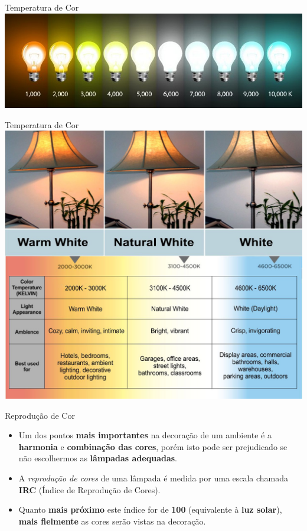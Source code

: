 \begin{frame}{Temperatura de Cor}
	\centering
	\includegraphics[width=1\linewidth]{Figuras/Ch07/fig2}
\end{frame}


\begin{frame}{Temperatura de Cor}
	\centering
	\includegraphics[width=0.7\linewidth]{Figuras/Ch07/fig3}
\end{frame}


\begin{frame}{Reprodução de Cor}
	\begin{block}{}
		\begin{itemize}
			\item Um dos pontos \textbf{mais importantes} na decoração de um ambiente é a \textbf{harmonia} e \textbf{combinação das cores}, porém isto pode ser prejudicado se não escolhermos as \textbf{lâmpadas adequadas}.
			\item A \textit{reprodução de cores} de uma lâmpada é medida por uma escala chamada \textbf{IRC} (Índice de Reprodução de Cores).
			\item Quanto \textbf{mais próximo} este índice for de \textbf{100} (equivalente à \textbf{luz solar}), \textbf{mais fielmente} as cores serão vistas na decoração.
		\end{itemize}
	\end{block}
\end{frame}


